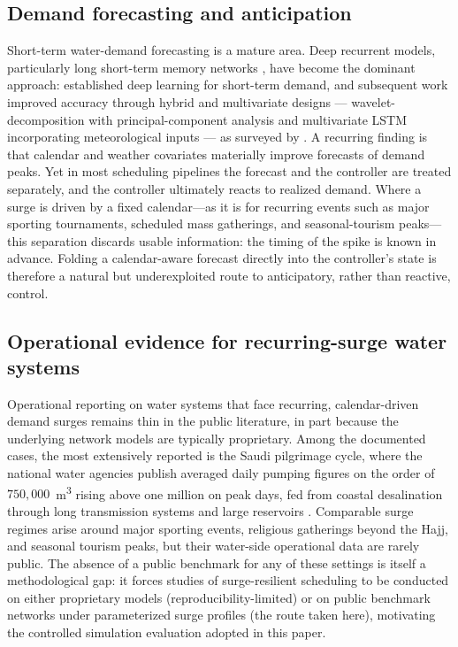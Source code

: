 \documentclass[11pt,a4paper]{article}
\begin{document}
\subsection{Demand forecasting and anticipation}
Short-term water-demand forecasting is a mature area. Deep recurrent models,
particularly long short-term memory networks \citep{Hochreiter1997LSTM}, have
become the dominant approach: \citet{Guo2018Forecast} established deep learning
for short-term demand, and subsequent work improved accuracy through hybrid and
multivariate designs --- wavelet-decomposition with principal-component analysis
\citep{Pu2023WaveletCNN} and multivariate LSTM incorporating meteorological
inputs \citep{Zanfei2022LSTM} --- as surveyed by \citet{Ghannam2024Review}. A
recurring finding is that calendar and weather covariates materially improve
forecasts of demand peaks. Yet in most scheduling pipelines the forecast and the
controller are treated separately, and the controller ultimately reacts to
realized demand. Where a surge is driven by a fixed calendar---as it is for
recurring events such as major sporting tournaments, scheduled mass gatherings,
and seasonal-tourism peaks---this separation discards usable information: the
timing of the spike is known in advance. Folding a calendar-aware forecast
directly into the controller's state is therefore a natural but underexploited
route to anticipatory, rather than reactive, control.

\subsection{Operational evidence for recurring-surge water systems}
Operational reporting on water systems that face recurring, calendar-driven
demand surges remains thin in the public literature, in part because the
underlying network models are typically proprietary. Among the documented cases,
the most extensively reported is the Saudi pilgrimage cycle, where the national
water agencies publish averaged daily pumping figures on the order of
$750{,}000$~m\textsuperscript{3} rising above one million on peak days, fed from
coastal desalination through long transmission systems and large reservoirs
\citep{SWA2025HajjReadiness,NWC2025Madinah}. Comparable surge regimes arise around
major sporting events, religious gatherings beyond the Hajj, and seasonal
tourism peaks, but their water-side operational data are rarely public. The
absence of a public benchmark for any of these settings is itself a methodological
gap: it forces studies of surge-resilient scheduling to be conducted on either
proprietary models (reproducibility-limited) or on public benchmark networks
under parameterized surge profiles (the route taken here), motivating the
controlled simulation evaluation adopted in this paper.
\end{document}
